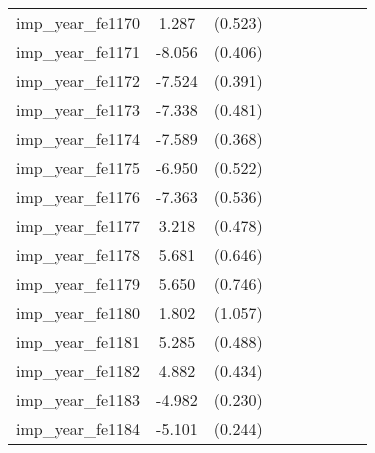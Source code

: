 {\begin{tabular}{l*{4}{cc}}
imp\_year\_fe1170&    1.287\sym{*}  &  (0.523)&                  &         &                  &         &                  &         \\
imp\_year\_fe1171&   -8.056\sym{***}&  (0.406)&                  &         &                  &         &                  &         \\
imp\_year\_fe1172&   -7.524\sym{***}&  (0.391)&                  &         &                  &         &                  &         \\
imp\_year\_fe1173&   -7.338\sym{***}&  (0.481)&                  &         &                  &         &                  &         \\
imp\_year\_fe1174&   -7.589\sym{***}&  (0.368)&                  &         &                  &         &                  &         \\
imp\_year\_fe1175&   -6.950\sym{***}&  (0.522)&                  &         &                  &         &                  &         \\
imp\_year\_fe1176&   -7.363\sym{***}&  (0.536)&                  &         &                  &         &                  &         \\
imp\_year\_fe1177&    3.218\sym{***}&  (0.478)&                  &         &                  &         &                  &         \\
imp\_year\_fe1178&    5.681\sym{***}&  (0.646)&                  &         &                  &         &                  &         \\
imp\_year\_fe1179&    5.650\sym{***}&  (0.746)&                  &         &                  &         &                  &         \\
imp\_year\_fe1180&    1.802         &  (1.057)&                  &         &                  &         &                  &         \\
imp\_year\_fe1181&    5.285\sym{***}&  (0.488)&                  &         &                  &         &                  &         \\
imp\_year\_fe1182&    4.882\sym{***}&  (0.434)&                  &         &                  &         &                  &         \\
imp\_year\_fe1183&   -4.982\sym{***}&  (0.230)&                  &         &                  &         &                  &         \\
imp\_year\_fe1184&   -5.101\sym{***}&  (0.244)&                  &         &                  &         &                  &         \\

\end{tabular}}

